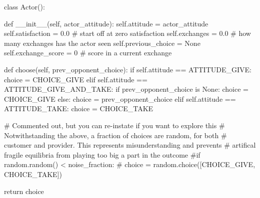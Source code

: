 \documentclass[
  letterpaper,
  DIV=11,
  numbers=noendperiod]{scrartcl}
\newenvironment{Shaded}{\begin{snugshade}}{\end{snugshade}}
\newcommand{\CommentTok}[1]{\textcolor[rgb]{0.37,0.37,0.37}{#1}}
\newcommand{\ControlFlowTok}[1]{\textcolor[rgb]{0.00,0.23,0.31}{#1}}
\newcommand{\DecValTok}[1]{\textcolor[rgb]{0.68,0.00,0.00}{#1}}
\newcommand{\FloatTok}[1]{\textcolor[rgb]{0.68,0.00,0.00}{#1}}
\newcommand{\FunctionTok}[1]{\textcolor[rgb]{0.28,0.35,0.67}{#1}}
\newcommand{\KeywordTok}[1]{\textcolor[rgb]{0.00,0.23,0.31}{#1}}
\newcommand{\NormalTok}[1]{\textcolor[rgb]{0.00,0.23,0.31}{#1}}
\newcommand{\OperatorTok}[1]{\textcolor[rgb]{0.37,0.37,0.37}{#1}}
\newcommand{\VariableTok}[1]{\textcolor[rgb]{0.07,0.07,0.07}{#1}}
\begin{document}
\begin{Shaded}
\begin{Highlighting}[]
\KeywordTok{class}\NormalTok{ Actor():}
       
    \KeywordTok{def} \FunctionTok{\_\_init\_\_}\NormalTok{(}\VariableTok{self}\NormalTok{, actor\_attitude):}
        \VariableTok{self}\NormalTok{.attitude }\OperatorTok{=}\NormalTok{ actor\_attitude}
        \VariableTok{self}\NormalTok{.satisfaction }\OperatorTok{=} \FloatTok{0.0} \CommentTok{\# start off at zero satisfaction}
        \VariableTok{self}\NormalTok{.exchanges }\OperatorTok{=} \FloatTok{0.0} \CommentTok{\# how many exchanges has the actor seen}
        \VariableTok{self}\NormalTok{.previous\_choice }\OperatorTok{=} \VariableTok{None}
        \VariableTok{self}\NormalTok{.exchange\_score }\OperatorTok{=} \DecValTok{0} \CommentTok{\# score in a current exchange}
            
    \KeywordTok{def}\NormalTok{ choose(}\VariableTok{self}\NormalTok{, prev\_opponent\_choice):}
        \ControlFlowTok{if} \VariableTok{self}\NormalTok{.attitude }\OperatorTok{==}\NormalTok{ ATTITUDE\_GIVE:}
\NormalTok{            choice }\OperatorTok{=}\NormalTok{ CHOICE\_GIVE}
        \ControlFlowTok{elif} \VariableTok{self}\NormalTok{.attitude }\OperatorTok{==}\NormalTok{ ATTITUDE\_GIVE\_AND\_TAKE:}
            \ControlFlowTok{if}\NormalTok{ prev\_opponent\_choice }\KeywordTok{is} \VariableTok{None}\NormalTok{:}
\NormalTok{                choice }\OperatorTok{=}\NormalTok{ CHOICE\_GIVE }
            \ControlFlowTok{else}\NormalTok{:}
\NormalTok{                choice }\OperatorTok{=}\NormalTok{ prev\_opponent\_choice}
        \ControlFlowTok{elif} \VariableTok{self}\NormalTok{.attitude }\OperatorTok{==}\NormalTok{ ATTITUDE\_TAKE:}
\NormalTok{            choice }\OperatorTok{=}\NormalTok{ CHOICE\_TAKE}
        
        \CommentTok{\# Commented out, but you can re{-}instate if you want to explore this}
        \CommentTok{\# Notwithstanding the above, a fraction of choices are random, for both }
        \CommentTok{\# customer and provider. This represents misunderstanding and prevents}
        \CommentTok{\# artifical fragile equilibria from playing too big a part in the outcome}
        \CommentTok{\#if random.random() \textless{} noise\_fraction:}
        \CommentTok{\#    choice = random.choice([CHOICE\_GIVE, CHOICE\_TAKE])}

        \ControlFlowTok{return}\NormalTok{ choice}
\end{Highlighting}
\end{Shaded}
\end{document}
